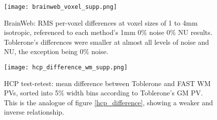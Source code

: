 \begin{appendices}
\begin{figure}
\centering
\texttt{[image: brainweb\_voxel\_supp.png]}
\caption{BrainWeb: RMS per-voxel differences at voxel sizes of 1 to 4mm isotropic, referenced to each method’s 1mm 0\% noise 0\% NU results. Toblerone’s differences were smaller at almost all levels of noise and NU, the exception being 0\% noise.  }
\label{brainweb_voxel_supp}
\end{figure}

\begin{figure}
\centering
\texttt{[image: hcp\_difference\_wm\_supp.png]}
\caption{HCP test-retest: mean difference between Toblerone and FAST WM PVs, sorted into 5\% width bins according to Toblerone’s GM PV. This is the analogue of figure \ref{hcp_difference}, showing a weaker and inverse relationship.}
\label{hcp_difference_wm_supp}
\end{figure}

\end{appendices}